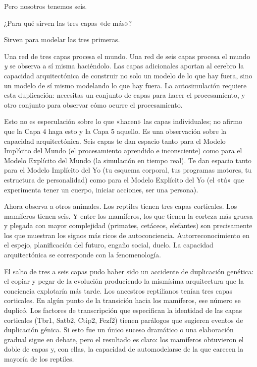 \documentclass[11pt, twoside, openright]{book}
\begin{document}
Pero nosotros tenemos seis.

¿Para qué sirven las tres capas «de más»?

Sirven para modelar las tres primeras.

Una red de tres capas procesa el mundo. Una red de seis capas procesa el mundo \textit{y} se observa a sí misma haciéndolo. Las capas adicionales aportan al cerebro la capacidad arquitectónica de construir no solo un modelo de lo que hay fuera, sino un modelo de sí mismo modelando lo que hay fuera. La autosimulación requiere esta duplicación: necesitas un conjunto de capas para hacer el procesamiento, y otro conjunto para observar cómo ocurre el procesamiento.

Esto no es especulación sobre lo que «hacen» las capas individuales; no afirmo que la Capa 4 haga esto y la Capa 5 aquello. Es una observación sobre la capacidad arquitectónica. Seis capas te dan espacio tanto para el Modelo Implícito del Mundo (el procesamiento aprendido e inconsciente) como para el Modelo Explícito del Mundo (la simulación en tiempo real). Te dan espacio tanto para el Modelo Implícito del Yo (tu esquema corporal, tus programas motores, tu estructura de personalidad) como para el Modelo Explícito del Yo (el «tú» que experimenta tener un cuerpo, iniciar acciones, ser una persona).

Ahora observa a otros animales. Los reptiles tienen tres capas corticales. Los mamíferos tienen seis. Y entre los mamíferos, los que tienen la corteza más gruesa y plegada con mayor complejidad (primates, cetáceos, elefantes) son precisamente los que muestran los signos más ricos de autoconciencia. Autorreconocimiento en el espejo, planificación del futuro, engaño social, duelo. La capacidad arquitectónica se corresponde con la fenomenología.

El salto de tres a seis capas pudo haber sido un accidente de duplicación genética: el copiar y pegar de la evolución produciendo la mismísima arquitectura que la conciencia explotaría más tarde. Los ancestros reptilianos tenían tres capas corticales. En algún punto de la transición hacia los mamíferos, ese número se duplicó. Los factores de transcripción que especifican la identidad de las capas corticales (Tbr1, Satb2, Ctip2, Fezf2) tienen parálogos que sugieren eventos de duplicación génica. Si esto fue un único suceso dramático o una elaboración gradual sigue en debate, pero el resultado es claro: los mamíferos obtuvieron el doble de capas y, con ellas, la capacidad de automodelarse de la que carecen la mayoría de los reptiles.
\end{document}
